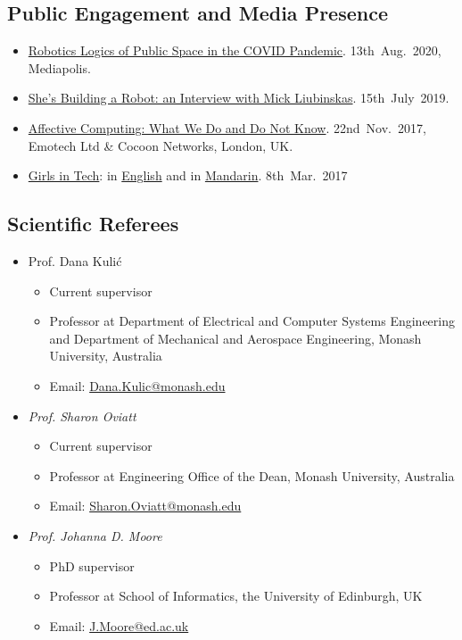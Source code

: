 \documentclass[11pt,letterpaper]{article}
\begin{document}
\subsection*{Public Engagement and Media Presence}
\begin{itemize}
  \item \href{https://www.mediapolisjournal.com/2020/08/robotic-logics-of-public-space/}{Robotics Logics of Public Space in the COVID Pandemic}. 13th~Aug.~2020, Mediapolis.
  \item \href{https://medium.com/shes-building-a-robot/leimin-tian-9843a1080cd8}{She's Building a Robot: an Interview with Mick Liubinskas}. 15th~July~2019.
  \item \href{https://www.eventbrite.co.uk/e/meet-ai-series-6-tickets-39512362540#}{Affective Computing: What We Do and Do Not Know}. 22nd~Nov.~2017, Emotech Ltd \& Cocoon Networks, London, UK.
  \item \href{https://youtu.be/6Cd_BquE95Q}{Girls in Tech}: in \href{https://youtu.be/dMMtaeqWGlg}{English} and in \href{https://youtu.be/G0cfdK36wTE}{Mandarin}. 8th~Mar.~2017
\end{itemize}

\subsection*{Scientific Referees}
\begin{itemize}
\item Prof. Dana Kuli{\'c}
  \begin{itemize}
  \item Current supervisor
  \item Professor at Department of Electrical and Computer Systems Engineering and Department of Mechanical and Aerospace Engineering, Monash University, Australia
  \item Email: \href{mailto:Dana.Kulic@monash.edu}{Dana.Kulic@monash.edu}
  \end{itemize}
\item \emph{Prof. Sharon Oviatt}
  \begin{itemize}
  \item Current supervisor
  \item Professor at Engineering Office of the Dean, Monash University, Australia
  \item Email: \href{mailto:Sharon.Oviatt@monash.edu}{Sharon.Oviatt@monash.edu}
  \end{itemize}
\item \emph{Prof. Johanna D. Moore}
  \begin{itemize}
  \item PhD supervisor
  \item Professor at School of Informatics, the University of Edinburgh, UK
  \item Email: \href{mailto:J.Moore@ed.ac.uk}{J.Moore@ed.ac.uk}
  \end{itemize}
\end{itemize}
\end{document}
